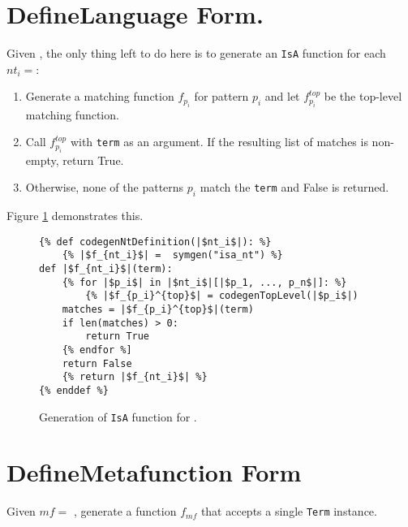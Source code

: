 \section{DefineLanguage Form.}
Given \DefineLanguage, the only thing left to do here is to generate an \texttt{IsA} function for each $nt_i=$\space\NtDefinition:
\begin{enumerate}
\item Generate a matching function $f_{p_i}$ for pattern $p_i$ and let $f_{p_i}^{top}$ be the top-level matching function.
\item Call $f_{p_i}^{top}$ with \texttt{term} as an argument. If the resulting list of matches is non-empty, return True.
\item Otherwise, none of the patterns $p_i$ match the \texttt{term} and False is returned.
\end{enumerate}

Figure \ref{codegen-ntdef} demonstrates this.

\begin{figure}
\begin{verbatim}
{% def codegenNtDefinition(|$nt_i$|): %}
	{% |$f_{nt_i}$| =  symgen("isa_nt") %}
def |$f_{nt_i}$|(term):
	{% for |$p_i$| in |$nt_i$|[|$p_1, ..., p_n$|]: %}
		{% |$f_{p_i}^{top}$| = codegenTopLevel(|$p_i$|)
	matches = |$f_{p_i}^{top}$|(term)
	if len(matches) > 0:
		return True
	{% endfor %]
	return False
	{% return |$f_{nt_i}$| %}
{% enddef %}
\end{verbatim}
\caption{Generation of \texttt{IsA} function for \NtDefinitionNoArgs.}
\label{codegen-ntdef}
\end{figure}

\section{DefineMetafunction Form}

Given $mf=$ \DefineMetafunction, generate a function $f_{mf}$ that accepts a single \texttt{Term} instance.

